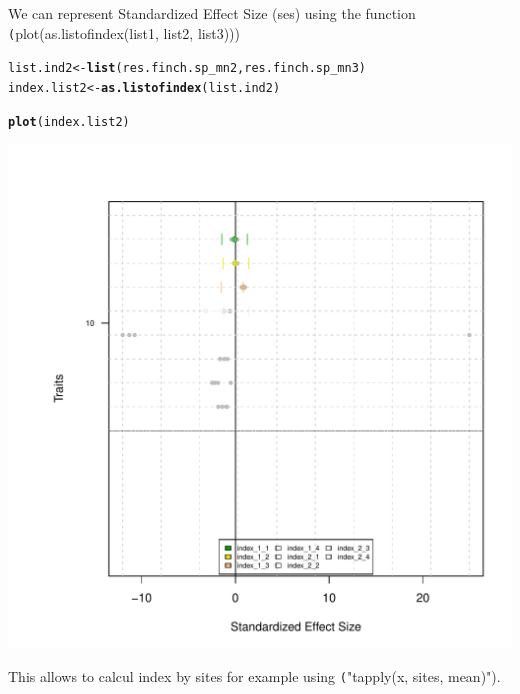 \documentclass[12pt]{article}\usepackage[]{graphicx}\usepackage[]{color}
\makeatletter
\def\maxwidth{ %
  \ifdim\Gin@nat@width>\linewidth
    \linewidth
  \else
    \Gin@nat@width
  \fi
}
\newcommand{\hlstd}[1]{\textcolor[rgb]{0.345,0.345,0.345}{#1}}%
\newcommand{\hlkwb}[1]{\textcolor[rgb]{0.69,0.353,0.396}{#1}}%
\newcommand{\hlkwd}[1]{\textcolor[rgb]{0.737,0.353,0.396}{\textbf{#1}}}%
\newenvironment{kframe}{%
 \def\at@end@of@kframe{}%
 \ifinner\ifhmode%
  \def\at@end@of@kframe{\end{minipage}}%
  \begin{minipage}{\columnwidth}%
 \fi\fi%
 \def\FrameCommand##1{\hskip\@totalleftmargin \hskip-\fboxsep
 \colorbox{shadecolor}{##1}\hskip-\fboxsep
     \hskip-\linewidth \hskip-\@totalleftmargin \hskip\columnwidth}%
 \MakeFramed {\advance\hsize-\width
   \@totalleftmargin\z@ \linewidth\hsize
   \@setminipage}}%
 {\par\unskip\endMakeFramed%
 \at@end@of@kframe}
\newenvironment{knitrout}{}{} %
\newcommand{\code}[1]{{{\tt #1}}}
\makeatother
\begin{document}
\newpage
We can represent Standardized Effect Size (ses) using the function \code(plot(as.listofindex(list1, list2, list3)))
\begin{knitrout}
\color{fgcolor}\begin{kframe}
\begin{alltt}
\hlstd{list.ind2} \hlkwb{<-} \hlkwd{list}\hlstd{(res.finch.sp_mn2, res.finch.sp_mn3)}
\hlstd{index.list2} \hlkwb{<-} \hlkwd{as.listofindex}\hlstd{(list.ind2)}

\hlkwd{plot}\hlstd{(index.list2)}
\end{alltt}
\end{kframe}
\includegraphics[width=\maxwidth]{figure/unnamed-chunk-29} 

\end{knitrout}


\newpage

This allows to calcul index by sites for example using \code("tapply(x, sites, mean)").
\end{document}
